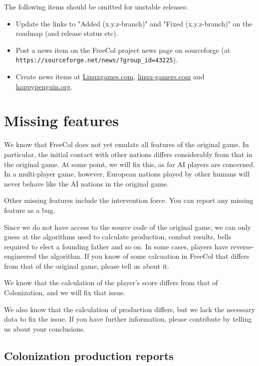 \documentclass[12pt]{book}
\begin{document}
The following items should be omitted for unstable releases:

\begin{itemize}

\item Update the links to "Added (x.y.z-branch)" and "Fixed
  (x.y.z-branch)" on the roadmap (and release status etc).

\item Post a news item on the FreeCol project news page on sourceforge
(at \verb+https://sourceforge.net/news/?group_id=43225+).

\item Create news items at \href{Linuxgames.com}{Linuxgames.com},
  \href{linux-gamers.com}{linux-gamers.com} and
  \href{happypenguin.org}{happypenguin.org}.

\end{itemize}


\hypertarget{Missing features}{\chapter{Missing features}}

We know that FreeCol does not yet emulate all features of the original
game. In particular, the initial contact with other nations differs
considerably from that in the original game. At some point, we will
fix this, as far AI players are concerned. In a multi-player game,
however, European nations played by other humans will never behave
like the AI nations in the original game.

Other missing features include the intervention force. You can report
any missing feature as a bug.

Since we do not have access to the source code of the original game,
we can only guess at the algorithms used to calculate production,
combat results, bells required to elect a founding father and so
on. In some cases, players have reverse-engineered the algorithm. If
you know of some calcuation in FreeCol that differs from that of the
original game, please tell us about it.

We know that the calculation of the player's score differs from that
of Colonization, and we will fix that issue.

We also know that the calculation of production differs, but we lack
the necessary data to fix the issue. If you have further information,
please contribute by telling us about your conclusions.


\hypertarget{Colonization production reports}
            {\section{Colonization production reports}}
\end{document}
